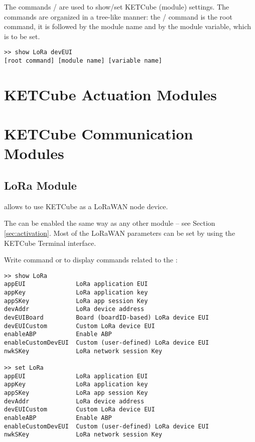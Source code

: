The commands / are used to show/set KETCube (module) settings. The commands are organized in a tree-like manner: the / command is the root command, it is followed by the module name and by the module variable, which is to be set. 

\begin{docCodeExample}
\begin{verbatim}
>> show LoRa devEUI
[root command] [module name] [variable name]
\end{verbatim}
\end{docCodeExample}


\clearpage
\section{KETCube Actuation Modules}
  
\clearpage
\section{KETCube Communication Modules}

\subsection{LoRa Module}
 allows to use KETCube as a LoRaWAN node device. 

The  can be enabled the same way as any other module -- see Section \ref{sec:activation}. Most of the LoRaWAN parameters can be set by using the KETCube Terminal interface.

Write command  or  to display commands related to the :
\begin{docCodeExample}
\begin{verbatim}
>> show LoRa
appEUI              LoRa application EUI
appKey              LoRa application key
appSKey             LoRa app session Key
devAddr             LoRa device address
devEUIBoard         Board (boardID-based) LoRa device EUI
devEUICustom        Custom LoRa device EUI
enableABP           Enable ABP
enableCustomDevEUI  Custom (user-defined) LoRa device EUI
nwkSKey             LoRa network session Key

>> set LoRa
appEUI              LoRa application EUI
appKey              LoRa application key
appSKey             LoRa app session Key
devAddr             LoRa device address
devEUICustom        Custom LoRa device EUI
enableABP           Enable ABP
enableCustomDevEUI  Custom (user-defined) LoRa device EUI
nwkSKey             LoRa network session Key
\end{verbatim}
\end{docCodeExample}

